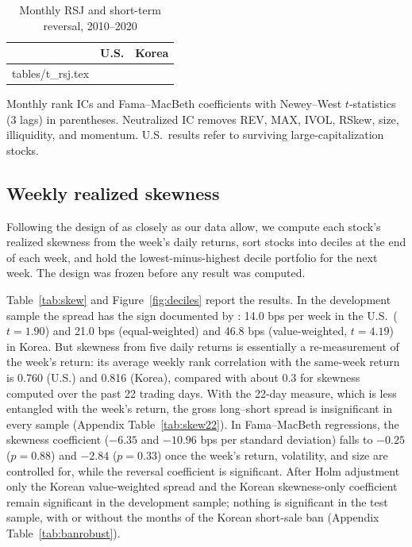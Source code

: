\documentclass[11pt]{article}
\makeatletter
\newcommand\inputtable[1]{\@@input #1 }
\makeatother
\begin{document}
\begin{table}[!htbp]
\centering
\begin{threeparttable}
\caption{Monthly RSJ and short-term reversal, 2010--2020}\label{tab:rsj}
\small
\begin{tabular}{lcc}
\toprule
 & U.S. & Korea \\
\midrule
\inputtable{tables/t_rsj.tex}
\bottomrule
\end{tabular}
\begin{tablenotes}\footnotesize
\item Monthly rank ICs and Fama--MacBeth coefficients with Newey--West $t$-statistics (3 lags) in parentheses. Neutralized IC removes REV, MAX, IVOL, RSkew, size, illiquidity, and momentum. U.S.\ results refer to surviving large-capitalization stocks.
\end{tablenotes}
\end{threeparttable}
\end{table}

\subsection{Weekly realized skewness}

Following the design of \citet{amaya2015} as closely as our data allow, we compute each stock's realized skewness from the week's daily returns, sort stocks into deciles at the end of each week, and hold the lowest-minus-highest decile portfolio for the next week. The design was frozen before any result was computed.

Table~\ref{tab:skew} and Figure~\ref{fig:deciles} report the results. In the development sample the spread has the sign documented by \citet{amaya2015}: 14.0 bps per week in the U.S.\ ($t=1.90$) and 21.0 bps (equal-weighted) and 46.8 bps (value-weighted, $t=4.19$) in Korea. But skewness from five daily returns is essentially a re-measurement of the week's return: its average weekly rank correlation with the same-week return is 0.760 (U.S.) and 0.816 (Korea), compared with about 0.3 for skewness computed over the past 22 trading days. With the 22-day measure, which is less entangled with the week's return, the gross long--short spread is insignificant in every sample (Appendix Table~\ref{tab:skew22}). In Fama--MacBeth regressions, the skewness coefficient ($-6.35$ and $-10.96$ bps per standard deviation) falls to $-0.25$ ($p=0.88$) and $-2.84$ ($p=0.33$) once the week's return, volatility, and size are controlled for, while the reversal coefficient is significant. After Holm adjustment only the Korean value-weighted spread and the Korean skewness-only coefficient remain significant in the development sample; nothing is significant in the test sample, with or without the months of the Korean short-sale ban (Appendix Table~\ref{tab:banrobust}).
\end{document}
